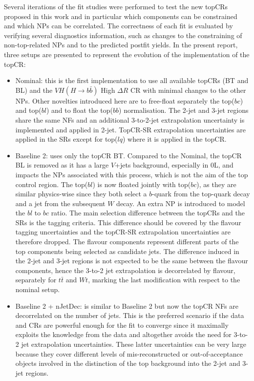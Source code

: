 Several iterations of the fit studies were performed to test the new topCRs proposed in this work and in particular which components can be constrained and which NPs can be correlated. The correctness of each fit is evaluated by verifying several diagnostics information, such as changes to the constraining of non-top-related NPs and to the predicted postfit yields. In the present report, three setups are presented to represent the evolution of the implementation of the topCR:
\begin{itemize}
\item Nominal: this is the first implementation to use all available topCRs (BT and BL) and the $VH(H\rightarrow b\bar{b})$ High $\Delta R$ CR with minimal changes to the other NPs. Other novelties introduced here are to free-float separately the top($bc$) and top($bl$) and to float the top($bb$) normalisation. The 2-jet and 3-jet regions share the same NFs and an additional 3-to-2-jet extrapolation uncertainty is implemented and applied in 2-jet. TopCR-SR extrapolation uncertainties are applied in the SRs except for top($lq$) where it is applied in the topCR. 
\item Baseline 2: uses only the topCR BT. Compared to the Nominal, the topCR BL is removed as it has a large $V$+jets background, especially in 0L, and impacts the NPs associated with this process, which is not the aim of the top control region. The top($bl$) is now floated jointly with top($bc$), as they are similar physics-wise since they both select a $b$-quark from the top-quark decay and a jet from the subsequent $W$ decay. An extra NP is introduced to model the $bl$ to $bc$ ratio. The main selection difference between the topCRs and the SRs is the tagging criteria. This difference should be covered by the flavour tagging uncertainties and the topCR-SR extrapolation uncertainties are therefore dropped. The flavour components represent different parts of the top components being selected as candidate jets. The difference induced in the 2-jet and 3-jet regions is not expected to be the same between the flavour components, hence the 3-to-2 jet extrapolation is decorrelated by flavour, separately for $t\bar{t}$ and $Wt$, marking the last modification with respect to the nominal setup.
\item Baseline 2 + nJetDec: is similar to Baseline 2 but now the topCR NFs are decorrelated on the number of jets. This is the preferred scenario if the data and CRs are powerful enough for the fit to converge since it maximally exploits the knowledge from the data and altogether avoids the need for 3-to-2 jet extrapolation uncertainties. These latter uncertainties can be very large because they cover different levels of mis-reconstructed or out-of-acceptance objects involved in the distinction of the top background into the 2-jet and 3-jet regions.
\end{itemize}

